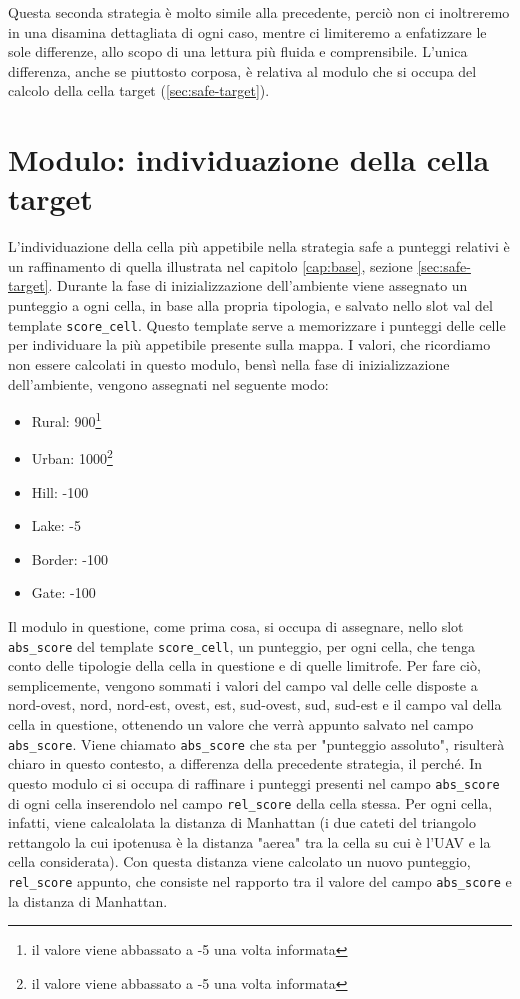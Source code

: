 Questa seconda strategia è molto simile alla precedente, perciò non ci inoltreremo in una disamina dettagliata di ogni caso, mentre ci limiteremo a enfatizzare le sole differenze, allo scopo di una lettura più fluida e comprensibile. L'unica differenza, anche se piuttosto corposa, è relativa al modulo che si occupa del calcolo della cella target (\ref{sec:safe-target}).

\section{Modulo: individuazione della cella target} \label{sec:rel-target}
L'individuazione della cella più appetibile nella strategia safe a punteggi relativi è un raffinamento di quella illustrata nel capitolo \ref{cap:base}, sezione \ref{sec:safe-target}. Durante la fase di inizializzazione dell'ambiente viene assegnato un punteggio a ogni cella, in base alla propria tipologia, e salvato nello slot val del template \texttt{score\_cell}. Questo template serve a memorizzare i punteggi delle celle per individuare la più appetibile presente sulla mappa. I valori, che ricordiamo non essere calcolati in questo modulo, bensì nella fase di inizializzazione dell'ambiente, vengono assegnati nel seguente modo: 
\begin{itemize}
	\item Rural: 900\footnote{il valore viene abbassato a -5 una volta informata}
	\item Urban: 1000\footnote{il valore viene abbassato a -5 una volta informata}
	\item Hill: -100
	\item Lake: -5
	\item Border: -100
	\item Gate: -100
\end{itemize}
Il modulo in questione, come prima cosa, si occupa di assegnare, nello slot \texttt{abs\_score} del template \texttt{score\_cell}, un punteggio, per ogni cella, che tenga conto delle tipologie della cella in questione e di quelle limitrofe. Per fare ciò, semplicemente, vengono sommati i valori del campo val delle celle disposte a nord-ovest, nord, nord-est, ovest, est, sud-ovest, sud, sud-est e il campo val della cella in questione, ottenendo un valore che verrà appunto salvato nel campo \texttt{abs\_score}. Viene chiamato \texttt{abs\_score} che sta per "punteggio assoluto", risulterà chiaro in questo contesto, a differenza della precedente strategia, il perché.
In questo modulo ci si occupa di raffinare i punteggi presenti nel campo \texttt{abs\_score} di ogni cella inserendolo nel campo \texttt{rel\_score} della cella stessa. Per ogni cella, infatti, viene calcalolata la distanza di Manhattan (i due cateti del triangolo rettangolo la cui ipotenusa è la distanza "aerea" tra la cella su cui è l'UAV e la cella considerata). Con questa distanza viene calcolato un nuovo punteggio, \texttt{rel\_score} appunto, che consiste nel rapporto tra il valore del campo \texttt{abs\_score} e la distanza di Manhattan.
